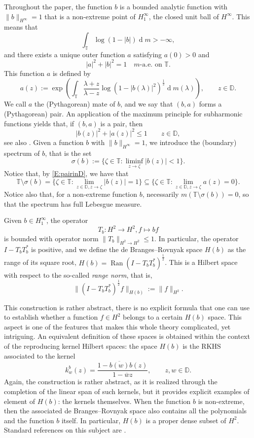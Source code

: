 \documentclass[12pt]{amsart}
\theoremstyle{definition}
\theoremstyle{remark}
\theoremstyle{remark}
\begin{document}
Throughout the paper, the function $b$ is a bounded analytic function with $\|b\|_{H^\infty}=1$ that is a non-extreme point of $H^\infty_1$, the closed unit ball of $H^\infty$. This means that
\[\int_\mathbb{T}\log(1-|b|)\operatorname{d}\!m >-\infty,\]
and there exists a unique outer function $a$ satisfying $a(0)>0$ and
\[|a|^2+|b|^2=1\quad m\text{-a.e. on}\,\,\mathbb{T}.\]
 This function $a$ is defined by 
\[a(z):= \exp{\left(\int_\mathbb{T} \frac{\lambda+z}{\lambda-z}\log(1-|b(\lambda)|^2)^\frac{1}{2}\operatorname{d}\!m(\lambda)\right)}, \qquad z\in\mathbb{D}.\]
We call $a$ the (Pythagorean) mate of $b$, and we say that $(b,a)$ forms a (Pythagorean) pair. An application of the maximum principle for subharmonic functions yields that, if $(b,a)$ is a pair, then
\begin{equation} \label{E:pairinD}
    |b(z)|^2+|a(z)|^2 \leq 1 \qquad z\in\mathbb{D},
\end{equation}
see also \cite[Exercise 23.1.1]{hb2}. Given a function $b$ with $\|b\|_{H^\infty}=1$, we introduce the (boundary) spectrum of $b$, that is the set
\[\sigma(b):=\{\zeta\in\mathbb{T}\colon \liminf_{z\to\zeta}|b(z)|<1\}.\]
Notice that, by \eqref{E:pairinD}, we have that
\begin{equation} \label{E:TminussigmainZa}
    \mathbb{T}\setminus \sigma(b)=\{\zeta\in\mathbb{T}\colon \lim_{z\in\mathbb{D},z\to\zeta}|b(z)|=1\}\subseteq \{\zeta\in\mathbb{T}\colon \lim_{z\in\mathbb{D},z\to\zeta}a(z)=0\}.
\end{equation}
Notice also that, for a non-extreme function $b$, necessarily $m(\mathbb{T}\setminus\sigma(b))=0$, so that the spectrum has full Lebesgue measure.


Given $b\in H^\infty_1$, the operator
\[T_b\colon H^2\to H^2, f\mapsto bf\]
is bounded with operator norm $\|T_b\|_{H^2\to H^2}\leq 1$. In particular, the operator $I-T_bT_b^*$ is positive, and we define the de Branges--Rovnyak space $H(b)$ as the range of its square root, $H(b)=\operatorname{Ran}(I-T_bT_b^*)^\frac{1}{2}$. This is a Hilbert space with respect to the so-called \emph{range norm}, that is,
\[\|(I-T_bT_b^*)^\frac{1}{2}f\|_{H(b)}:=\|f\|_{H^2}.\]

This construction is rather abstract, there is no explicit formula that one can use to establish whether a function $f\in H^2$ belongs to a certain $H(b)$ space. This aspect is one of the features that makes this whole theory complicated, yet intriguing. An equivalent definition of these spaces is obtained within the context of the reproducing kernel Hilbert spaces: the space $H(b)$ is the RKHS associated to the kernel
\[k_w^b(z)=\frac{1-\overline{b(w)}b(z)}{1-\overline{w}z},\qquad z,w\in\mathbb{D}.\]
Again, the construction is rather abstract, as it is realized through the completion of the linear span of such kernels, but it provides explicit examples of element of $H(b)$: the kernels themselves. When the function $b$ is non-extreme, then the associated de Branges--Rovnyak space also contains all the polynomials and the function $b$ itself. In particular, $H(b)$ is a proper dense subset of $H^2$. Standard references on this subject are \cite{hb1, hb2, sarHb}.
\end{document}
